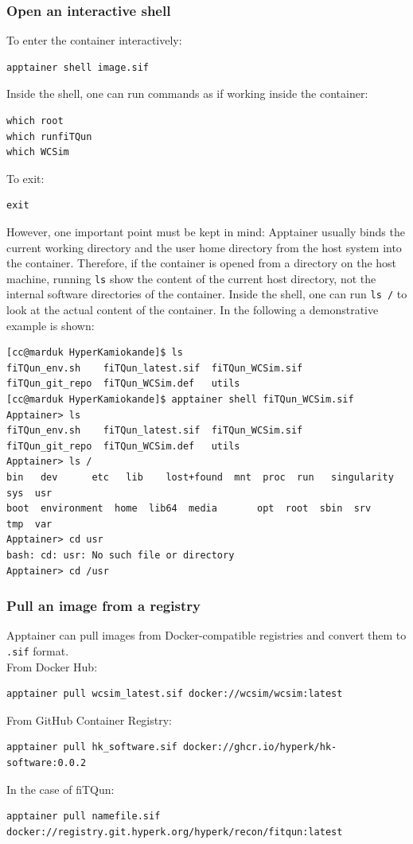 \documentclass{article}
\numberwithin{table}{subsection}
\numberwithin{figure}{subsection}
\numberwithin{equation}{subsection}
\numberwithin{footnote}{subsection}
\begin{document}
\subsubsection{Open an interactive shell}

To enter the container interactively:

\begin{lstlisting}[style=terminal]
apptainer shell image.sif
\end{lstlisting}
Inside the shell, one can run commands as if working inside the container:
\begin{lstlisting}[style=terminal]
which root
which runfiTQun
which WCSim
\end{lstlisting}
To exit:
\begin{lstlisting}[style=terminal]
exit
\end{lstlisting}
However, one important point must be kept in mind: Apptainer usually binds the current working directory and the user
home directory from the host system into the container. Therefore, if the container is opened from a directory on the host machine, running \texttt{ls} show the content of the current host directory, not the internal software
directories of the container. Inside the shell, one can run \texttt{ls /} to look at the actual content of the container.
In the following a demonstrative example is shown:
\begin{lstlisting}[style=terminal]
[cc@marduk HyperKamiokande]$ ls
fiTQun_env.sh    fiTQun_latest.sif  fiTQun_WCSim.sif
fiTQun_git_repo  fiTQun_WCSim.def   utils
[cc@marduk HyperKamiokande]$ apptainer shell fiTQun_WCSim.sif
Apptainer> ls
fiTQun_env.sh	 fiTQun_latest.sif  fiTQun_WCSim.sif
fiTQun_git_repo  fiTQun_WCSim.def   utils
Apptainer> ls /
bin   dev	   etc	 lib	lost+found  mnt  proc  run   singularity  sys  usr
boot  environment  home  lib64	media	    opt  root  sbin  srv	  tmp  var
Apptainer> cd usr
bash: cd: usr: No such file or directory
Apptainer> cd /usr
\end{lstlisting}


\subsubsection{Pull an image from a registry}

Apptainer can pull images from Docker-compatible registries and convert them to
\texttt{.sif} format.\\
From Docker Hub:
\begin{lstlisting}[style=terminal]
apptainer pull wcsim_latest.sif docker://wcsim/wcsim:latest
\end{lstlisting}
From GitHub Container Registry:
\begin{lstlisting}[style=terminal]
apptainer pull hk_software.sif docker://ghcr.io/hyperk/hk-software:0.0.2
\end{lstlisting}
In the case of fiTQun:
\begin{lstlisting}[style=terminal]
apptainer pull namefile.sif docker://registry.git.hyperk.org/hyperk/recon/fitqun:latest
\end{lstlisting}
\end{document}
